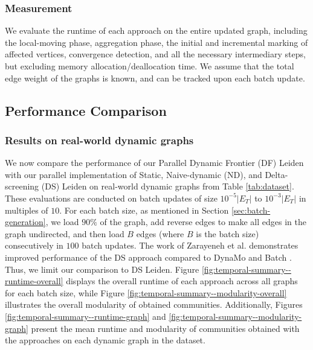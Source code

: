 \subsubsection{Measurement}
\label{sec:measurement}

We evaluate the runtime of each approach on the entire updated graph, including the local-moving phase, aggregation phase, the initial and incremental marking of affected vertices, convergence detection, and all the necessary intermediary steps, but excluding memory allocation/deallocation time. We assume that the total edge weight of the graphs is known, and can be tracked upon each batch update.








\subsection{Performance Comparison}
\label{sec:performance-comparison}

\subsubsection{Results on real-world dynamic graphs}

We now compare the performance of our Parallel Dynamic Frontier (DF) Leiden with our parallel implementation of Static, Naive-dynamic (ND), and Delta-screening (DS) Leiden on real-world dynamic graphs from Table \ref{tab:dataset}. These evaluations are conducted on batch updates of size $10^{-5}|E_T|$ to $10^{-3}|E_T|$ in multiples of $10$. For each batch size, as mentioned in Section \ref{sec:batch-generation}, we load $90\%$ of the graph, add reverse edges to make all edges in the graph undirected, and then load $B$ edges (where $B$ is the batch size) consecutively in $100$ batch updates. The work of Zarayeneh et al. \cite{com-zarayeneh21} demonstrates improved performance of the DS approach compared to DynaMo \cite{com-zhuang19} and Batch \cite{com-chong13}. Thus, we limit our comparison to DS Leiden. Figure \ref{fig:temporal-summary--runtime-overall} displays the overall runtime of each approach across all graphs for each batch size, while Figure \ref{fig:temporal-summary--modularity-overall} illustrates the overall modularity of obtained communities. Additionally, Figures \ref{fig:temporal-summary--runtime-graph} and \ref{fig:temporal-summary--modularity-graph} present the mean runtime and modularity of communities obtained with the approaches on each dynamic graph in the dataset.

